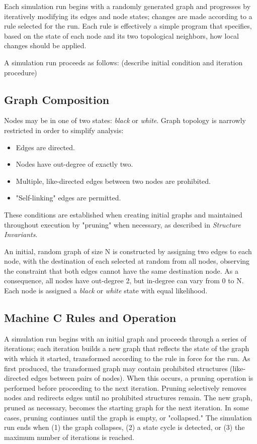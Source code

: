 \documentclass[twoside,twocolumn]{article}
\begin{document}
Each simulation run begins with a randomly generated graph and progresses by
iteratively modifying its edges and node states; changes are made according to a rule selected
for the run. Each rule is effectively a simple program  that specifies, based on the state
of each node and its two topological neighbors, how local changes should be applied.

A simulation run proceeds as follows: (describe initial condition and iteration procedure)

\subsection{Graph Composition}

Nodes may be in one of two states: \textit{black} or \textit{white}.
Graph topology is narrowly restricted in order to simplify analysis:

\begin{itemize}
    \item Edges are directed.
    \item Nodes have out-degree of exactly two.
    \item Multiple, like-directed edges between two nodes are prohibited.
    \item "Self-linking" edges are permitted.
\end{itemize}

These conditions are established when creating initial graphs and maintained
throughout execution by "pruning" when necessary, as described in \textit{Structure Invariants}.

An initial, random graph of size N is constructed by assigning two edges to each node, with
the destination of each selected at random from all nodes, observing the
constraint that both edges cannot have the same destination node. As a consequence,
all nodes have out-degree 2, but in-degree can vary from 0 to N. Each node is assigned
a \textit{black} or \textit{white} state with equal likelihood.

\subsection{Machine \textbf{C} Rules and Operation}

A simulation run begins with an initial graph and proceeds through a series of
iterations; each iteration builds a new graph that reflects the state of the graph
with which it started, transformed according to the rule in force for the run.
As first produced, the transformed graph may contain prohibited structures
(like-directed edges between pairs of nodes). When this occurs, a pruning operation is
performed before proceeding to the next iteration. Pruning selectively removes
nodes and redirects edges until no prohibited structures remain.
The new graph, pruned as necessary, becomes the starting graph for the next iteration.
In some cases, pruning continues until the graph is empty, or "collapsed."
The simulation run ends when (1) the graph collapses, (2) a state cycle is detected,
or (3) the maximum number of iterations is reached.
\end{document}

